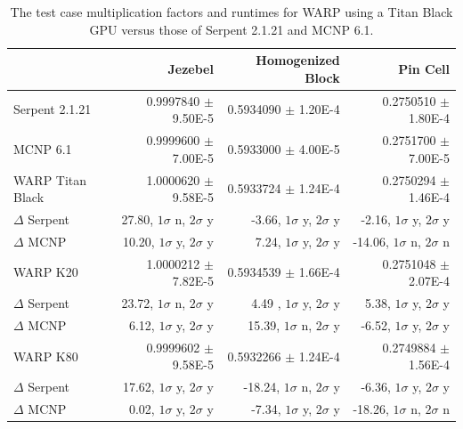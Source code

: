 \documentclass[preprint,12pt]{elsarticle}
\begin{document}
\begin{table}[h]
\centering
\caption{The test case multiplication factors and runtimes for WARP using a Titan Black GPU versus those of Serpent 2.1.21 and MCNP 6.1.}
\label{results_table_keff}
\scriptsize
\begin{tabular}{| l | r | r | r |}
\cline{2-4}
\multicolumn{1}{c|}{}               & Jezebel                         &  Homogenized Block               & Pin Cell                          \\
\hline                          
Serpent 2.1.21                      & 0.9997840 $\pm$ 9.50E-5         & 0.5934090 $\pm$ 1.20E-4          & 0.2750510 $\pm$ 1.80E-4           \\
\hline                          
MCNP 6.1                            & 0.9999600 $\pm$ 7.00E-5         & 0.5933000 $\pm$ 4.00E-5          & 0.2751700 $\pm$ 7.00E-5           \\
\hline                          
WARP Titan Black                    & 1.0000620 $\pm$ 9.58E-5         & 0.5933724 $\pm$ 1.24E-4          & 0.2750294 $\pm$ 1.46E-4           \\
    \qquad\qquad   $\Delta$ Serpent & 27.80, $1\sigma$ n, $2\sigma$ y & -3.66, $1\sigma$ y, $2\sigma$ y  &  -2.16, $1\sigma$ y, $2\sigma$ y  \\
    \qquad\qquad   $\Delta$ MCNP    & 10.20, $1\sigma$ y, $2\sigma$ y &  7.24, $1\sigma$ y, $2\sigma$ y  & -14.06, $1\sigma$ n, $2\sigma$ n  \\
\hline
WARP K20                            & 1.0000212 $\pm$ 7.82E-5         & 0.5934539 $\pm$ 1.66E-4          & 0.2751048 $\pm$ 2.07E-4           \\
    \qquad\qquad   $\Delta$ Serpent & 23.72, $1\sigma$ n, $2\sigma$ y & 4.49 , $1\sigma$ y, $2\sigma$ y  &   5.38, $1\sigma$ y, $2\sigma$ y  \\
    \qquad\qquad   $\Delta$ MCNP    &  6.12, $1\sigma$ y, $2\sigma$ y & 15.39, $1\sigma$ n, $2\sigma$ y  &  -6.52, $1\sigma$ y, $2\sigma$ y  \\
\hline
WARP K80                            & 0.9999602 $\pm$ 9.58E-5         & 0.5932266 $\pm$ 1.24E-4          & 0.2749884 $\pm$ 1.56E-4           \\
    \qquad\qquad   $\Delta$ Serpent & 17.62, $1\sigma$ y, $2\sigma$ y & -18.24, $1\sigma$ n, $2\sigma$ y &  -6.36, $1\sigma$ y, $2\sigma$ y  \\
    \qquad\qquad   $\Delta$ MCNP    &  0.02, $1\sigma$ y, $2\sigma$ y &  -7.34, $1\sigma$ y, $2\sigma$ y & -18.26, $1\sigma$ n, $2\sigma$ n  \\
\hline
\end{tabular}


\end{table}
\end{document}

